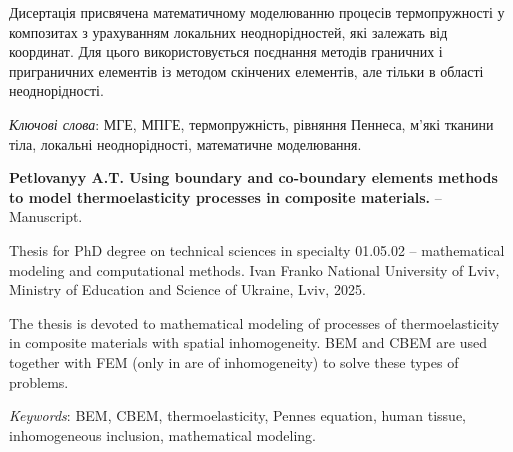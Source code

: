 Дисертація присвячена математичному моделюванню процесів термопружності у композитах з урахуванням локальних
неоднорідностей, які залежать від координат. Для цього використовується поєднання методів граничних і приграничних
елементів із методом скінчених елементів, але тільки в області неоднорідності.

\textit{Ключові слова}: МГЕ, МПГЕ, термопружність, рівняння Пеннеса, м'які тканини тіла, локальні неоднорідності,
математичне моделювання.

\textbf{Petlovanyy A.T. Using boundary and co-boundary elements methods to model thermoelasticity processes in composite 
materials.} -- Manuscript.

Thesis for PhD degree on technical sciences in specialty 01.05.02 -- mathematical modeling and computational methods.
Ivan Franko National University of Lviv, Ministry of Education and Science of Ukraine, Lviv, 2025.

The thesis is devoted to mathematical modeling of processes of thermoelasticity in composite materials with spatial
inhomogeneity. BEM and CBEM are used together with FEM (only in are of inhomogeneity) to solve these types of problems.

\textit{Keywords}: BEM, CBEM, thermoelasticity, Pennes equation, human tissue, inhomogeneous inclusion,
mathematical modeling.
